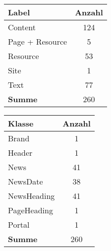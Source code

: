     \begin{table}[htb]
        \begin{subtable}[c]{0.3\textwidth}
            \centering
            \begin{tabular}{|l|c|}
                \hline
                \textbf{Label}  & \multicolumn{1}{l|}{\textbf{Anzahl}} \\ \hline
                Content         & 124                                  \\ \hline
                Page + Resource & 5                                    \\ \hline
                Resource        & 53                                   \\ \hline
                Site            & 1                                    \\ \hline
                Text            & 77                                   \\ \hline
                \hline
                \textbf{Summe}  & 260                                  \\ \hline
            \end{tabular}
            \label{table:findingsNewsFiguresNodesByLabel}
        \end{subtable}
        \begin{subtable}[c]{0.3\textwidth}
            \centering
            \begin{tabular}{|l|c|}
                \hline
                \textbf{Klasse} & \multicolumn{1}{l|}{\textbf{Anzahl}} \\ \hline
                Brand           & 1                                    \\ \hline
                Header          & 1                                    \\ \hline
                News            & 41                                   \\ \hline
                NewsDate        & 38                                   \\ \hline
                NewsHeading     & 41                                   \\ \hline
                PageHeading     & 1                                    \\ \hline
                Portal          & 1                                    \\ \hline
                \hline
                \textbf{Summe}  & 260                                  \\ \hline

\end{tabular}
\end{subtable}
\end{table}
